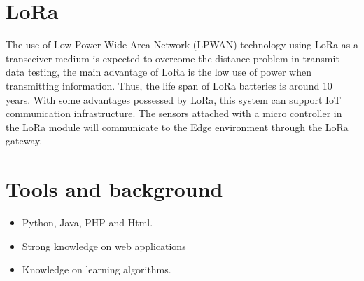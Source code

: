 \documentclass[a4papert]{article}
\begin{document}
\section{LoRa}

The use of Low Power Wide Area Network (LPWAN) technology using LoRa as a transceiver medium is expected to overcome the distance problem in transmit data testing,
	the main advantage of LoRa is the low use of power when transmitting information.
Thus,
	the life span of LoRa batteries is around 10 years.
With some advantages possessed by LoRa,
	this system can support IoT communication infrastructure.
The sensors attached with a micro controller in the LoRa module will communicate to the Edge environment through the LoRa gateway.


\section{Tools and background}

\begin{itemize}
	\item Python, Java, PHP and Html.
	\item Strong knowledge on web applications
	\item Knowledge on learning algorithms.
\end{itemize}


\printbibliography



\end{document}
